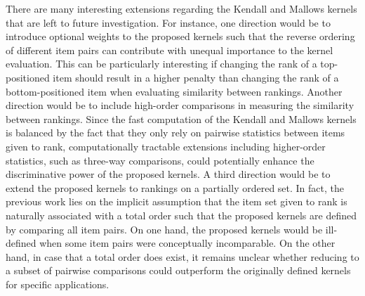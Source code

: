 There are many interesting extensions regarding the Kendall and Mallows kernels that are left to future investigation. For instance, one direction would be to introduce optional weights to the proposed kernels such that the reverse ordering of different item pairs can contribute with unequal importance to the kernel evaluation. This can be particularly interesting if changing the rank of a top-positioned item should result in a higher penalty than changing the rank of a bottom-positioned item when evaluating similarity between rankings. Another direction would be to include high-order comparisons in measuring the similarity between rankings. Since the fast computation of the Kendall and Mallows kernels is balanced by the fact that they only rely on pairwise statistics between items given to rank, computationally tractable extensions including higher-order statistics, such as three-way comparisons, could potentially enhance the discriminative power of the proposed kernels. A third direction would be to extend the proposed kernels to rankings on a partially ordered set. In fact, the previous work lies on the implicit assumption that the item set given to rank is naturally associated with a total order such that the proposed kernels are defined by comparing all item pairs. On one hand, the proposed kernels would be ill-defined when some item pairs were conceptually incomparable. On the other hand, in case that a total order does exist, it remains unclear whether reducing to a subset of pairwise comparisons could outperform the originally defined kernels for specific applications.

